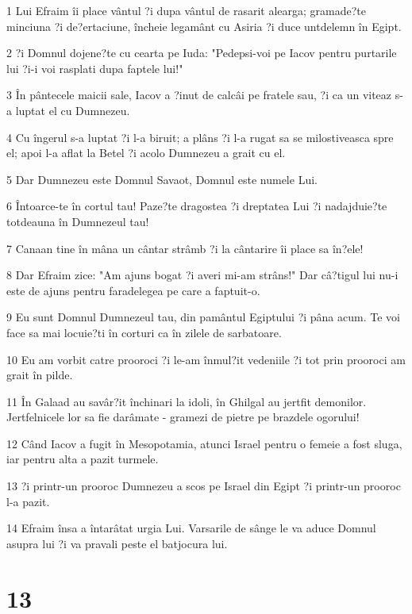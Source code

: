 \par 1 Lui Efraim îi place vântul ?i dupa vântul de rasarit alearga; gramade?te minciuna ?i de?ertaciune, încheie legamânt cu Asiria ?i duce untdelemn în Egipt.
\par 2 ?i Domnul dojene?te cu cearta pe Iuda: "Pedepsi-voi pe Iacov pentru purtarile lui ?i-i voi rasplati dupa faptele lui!"
\par 3 În pântecele maicii sale, Iacov a ?inut de calcâi pe fratele sau, ?i ca un viteaz s-a luptat el cu Dumnezeu.
\par 4 Cu îngerul s-a luptat ?i l-a biruit; a plâns ?i l-a rugat sa se milostiveasca spre el; apoi l-a aflat la Betel ?i acolo Dumnezeu a grait cu el.
\par 5 Dar Dumnezeu este Domnul Savaot, Domnul este numele Lui.
\par 6 Întoarce-te în cortul tau! Paze?te dragostea ?i dreptatea Lui ?i nadajduie?te totdeauna în Dumnezeul tau!
\par 7 Canaan tine în mâna un cântar strâmb ?i la cântarire îi place sa în?ele!
\par 8 Dar Efraim zice: "Am ajuns bogat ?i averi mi-am strâns!" Dar câ?tigul lui nu-i este de ajuns pentru faradelegea pe care a faptuit-o.
\par 9 Eu sunt Domnul Dumnezeul tau, din pamântul Egiptului ?i pâna acum. Te voi face sa mai locuie?ti în corturi ca în zilele de sarbatoare.
\par 10 Eu am vorbit catre prooroci ?i le-am înmul?it vedeniile ?i tot prin prooroci am grait în pilde.
\par 11 În Galaad au savâr?it închinari la idoli, în Ghilgal au jertfit demonilor. Jertfelnicele lor sa fie darâmate - gramezi de pietre pe brazdele ogorului!
\par 12 Când Iacov a fugit în Mesopotamia, atunci Israel pentru o femeie a fost sluga, iar pentru alta a pazit turmele.
\par 13 ?i printr-un prooroc Dumnezeu a scos pe Israel din Egipt ?i printr-un prooroc l-a pazit.
\par 14 Efraim însa a întarâtat urgia Lui. Varsarile de sânge le va aduce Domnul asupra lui ?i va pravali peste el batjocura lui.

\chapter{13}

